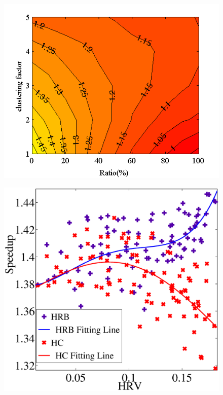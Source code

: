 \begin{figure}

\centering
\begin{minipage}{.5\textwidth}
  \centering
  \includegraphics[width=1.0\linewidth]{figures/balance//cfactor.png}
  \label{fig:shc}
\end{minipage}%
\begin{minipage}{.5\textwidth}
  \centering
  \includegraphics[width=0.9\linewidth]{figures/balance/HRB_figure_2.eps}
  \label{fig:hrb}
\end{minipage}
\end{figure}






